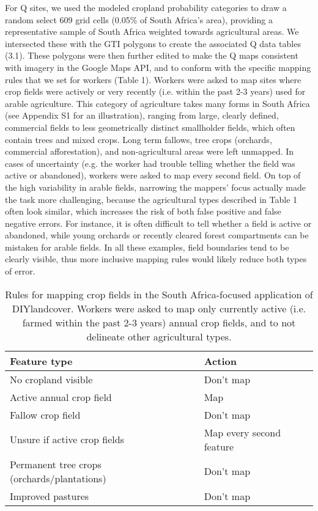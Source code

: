 \documentclass[preprint,12pt,authoryear]{elsarticle}
\begin{document}
For Q sites, we used the modeled cropland probability categories to draw a random select 609 grid cells (0.05\% of South Africa's area), providing a representative sample of South Africa weighted towards agricultural areas. We intersected these with the GTI polygons to create the associated Q data tables (3.1). These polygons were then further edited to make the Q maps consistent with imagery in the Google Maps API, and to conform with the specific mapping rules that we set for workers (Table 1). Workers were asked to map sites where crop fields were actively or very recently (i.e. within the past 2-3 years) used for arable agriculture. This category of agriculture takes many forms in South Africa (see Appendix S1 for an illustration), ranging from large, clearly defined, commercial fields to less geometrically distinct smallholder fields, which often contain trees and mixed crops. Long term fallows, tree crops (orchards, commercial afforestation), and non-agricultural areas were left unmapped. In cases of uncertainty (e.g. the worker had trouble telling whether the field was active or abandoned), workers were asked to map every second field. On top of the high variability in arable fields, narrowing the mappers' focus actually made the task more challenging, because the agricultural types described in Table 1 often look similar, which increases the risk of both false positive and false negative errors. For instance, it is often difficult to tell whether a field is active or abandoned, while young orchards or recently cleared forest compartments can be mistaken for arable fields. In all these examples, field boundaries tend to be clearly visible, thus more inclusive mapping rules would likely reduce both types of error. 

\begin{table}[htdp]
  \caption{Rules for mapping crop fields in the South Africa-focused application of DIYlandcover. Workers were asked to map only currently active (i.e. farmed within the past 2-3 years) annual crop fields, and to not delineate other agricultural types.}
   \begin{center}  
   \begin{tabular}{l|l}
      \hline
      \textbf{Feature type} & \textbf{Action} \\
      \hline\hline
      No cropland visible & Don't map \\
      Active annual crop field & Map \\
      Fallow crop field & Don't map \\
      Unsure if active crop fields & Map every second feature \\
      Permanent tree crops (orchards/plantations) & Don't map \\
      Improved pastures & Don't map \\
     \hline
  \end{tabular}
  \end{center}
  \label{default}
\end{table}%
\end{document}
